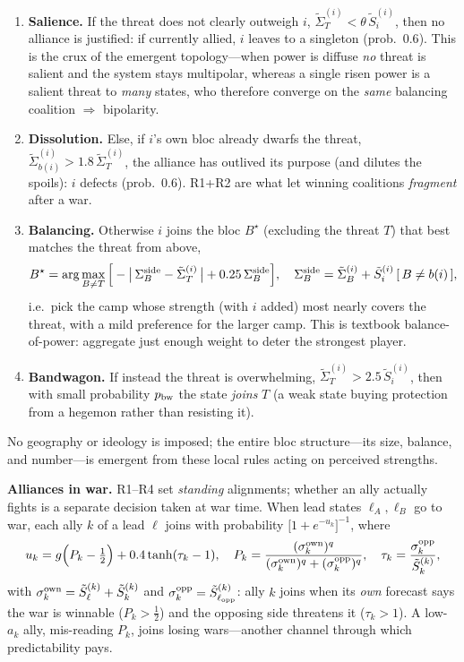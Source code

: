 \documentclass[11pt]{article}
\begin{document}
\begin{enumerate}
\item[\textbf{R1}] \textbf{Salience.} If the threat does not clearly outweigh
  $i$, $\tilde\Sigma^{(i)}_T<\theta\,\tilde S^{(i)}_i$, then no alliance is
  justified: if currently allied, $i$ leaves to a singleton (prob.\ $0.6$). This
  is the crux of the emergent topology---when power is diffuse \emph{no} threat
  is salient and the system stays multipolar, whereas a single risen power is a
  salient threat to \emph{many} states, who therefore converge on the \emph{same}
  balancing coalition $\Rightarrow$ bipolarity.
\item[\textbf{R2}] \textbf{Dissolution.} Else, if $i$'s own bloc already dwarfs
  the threat, $\tilde\Sigma^{(i)}_{b(i)}>1.8\,\tilde\Sigma^{(i)}_T$, the alliance
  has outlived its purpose (and dilutes the spoils): $i$ defects (prob.\ $0.6$).
  R1+R2 are what let winning coalitions \emph{fragment} after a war.
\item[\textbf{R3}] \textbf{Balancing.} Otherwise $i$ joins the bloc $B^\star$
  (excluding the threat $T$) that best matches the threat from above,
  \begin{equation}
  B^\star=\arg\max_{B\neq T}\Big[-\big|\,\Sigma^{\rm side}_B-\tilde\Sigma^{(i)}_T\,\big|
          +0.25\,\Sigma^{\rm side}_B\Big],\quad
  \Sigma^{\rm side}_B=\tilde\Sigma^{(i)}_B+\tilde S^{(i)}_i\,[\,B\neq b(i)\,],
  \end{equation}
  i.e.\ pick the camp whose strength (with $i$ added) most nearly covers the
  threat, with a mild preference for the larger camp. This is textbook
  balance-of-power: aggregate just enough weight to deter the strongest player.
\item[\textbf{R4}] \textbf{Bandwagon.} If instead the threat is overwhelming,
  $\tilde\Sigma^{(i)}_T>2.5\,\tilde S^{(i)}_i$, then with small probability
  $p_{\rm bw}$ the state \emph{joins} $T$ (a weak state buying protection from a
  hegemon rather than resisting it).
\end{enumerate}
No geography or ideology is imposed; the entire bloc structure---its size,
balance, and number---is emergent from these local rules acting on perceived
strengths.

\textbf{Alliances in war.} R1--R4 set \emph{standing} alignments; whether an ally
actually fights is a separate decision taken at war time. When lead states
$\ell_A,\ell_B$ go to war, each ally $k$ of a lead $\ell$ joins with probability
$\big[1+e^{-u_k}\big]^{-1}$, where
\begin{equation}
u_k=g\Big(P_k-\tfrac12\Big)+0.4\tanh(\tau_k-1),\quad
P_k=\frac{(\sigma^{\rm own}_k)^{q}}{(\sigma^{\rm own}_k)^{q}+(\sigma^{\rm opp}_k)^{q}},\quad
\tau_k=\frac{\sigma^{\rm opp}_k}{\tilde S^{(k)}_k},
\end{equation}
with $\sigma^{\rm own}_k=\tilde S^{(k)}_\ell+\tilde S^{(k)}_k$ and
$\sigma^{\rm opp}_k=\tilde S^{(k)}_{\ell_{\rm opp}}$: ally $k$ joins when its
\emph{own} forecast says the war is winnable ($P_k>\tfrac12$) and the opposing
side threatens it ($\tau_k>1$). A low-$a_k$ ally, mis-reading $P_k$, joins losing
wars---another channel through which predictability pays.
\end{document}
